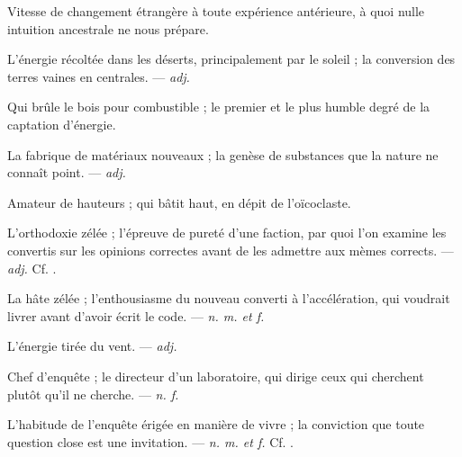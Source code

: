  Vitesse de changement étrangère à toute expérience antérieure, à quoi nulle intuition ancestrale ne nous prépare. 

 L'énergie récoltée dans les déserts, principalement par le soleil ; la conversion des terres vaines en centrales. ---  \textit{adj.}

  Qui brûle le bois pour combustible ; le premier et le plus humble degré de la captation d'énergie.

 La fabrique de matériaux nouveaux ; la genèse de substances que la nature ne connaît point. ---  \textit{adj.}

 Amateur de hauteurs ; qui bâtit haut, en dépit de l'oïcoclaste.

 L'orthodoxie zélée ; l'épreuve de pureté d'une faction, par quoi l'on examine les convertis sur les opinions correctes avant de les admettre aux mèmes corrects. ---  \textit{adj.} Cf. .

 La hâte zélée ; l'enthousiasme du nouveau converti à l'accélération, qui voudrait livrer avant d'avoir écrit le code. ---  \textit{n. m. et f.}

 L'énergie tirée du vent. ---  \textit{adj.}

 Chef d'enquête ; le directeur d'un laboratoire, qui dirige ceux qui cherchent plutôt qu'il ne cherche. ---  \textit{n. f.}

 L'habitude de l'enquête érigée en manière de vivre ; la conviction que toute question close est une invitation. ---  \textit{n. m. et f.} Cf. .

